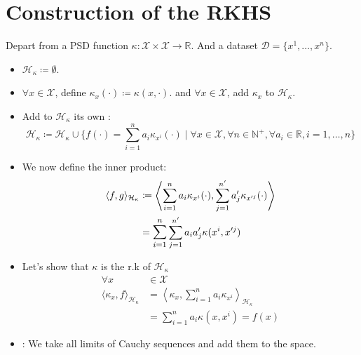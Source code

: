 \pagebreak
\section{Construction of the RKHS}

Depart from a PSD function $\kappa: \mathcal{X} \times \mathcal{X} \to \mathds{R}$.
And a dataset $\mathcal{D} = \{x^1, \dots, x^n\}$.

\begin{itemize}
	\item $\mathcal{H}_\kappa \coloneqq \emptyset$.
	\item $\forall x \in \mathcal{X}$, define $\kappa_x(\cdot) \coloneqq \kappa(x, \cdot)$.
	      and $\forall x \in \mathcal{X}$, add $\kappa_x$ to $\mathcal{H}_\kappa$.
	\item Add to $\mathcal{H}_\kappa$ its own :
	      \begin{equation*}
		      \mathcal{H}_\kappa \coloneqq \mathcal{H}_\kappa \cup \{
		      f(\cdot) = \sum_{i=1}^n a_i \kappa_{x^i}(\cdot) \mid
		      \forall x \in \mathcal{X},
		      \forall n \in \mathds{N}^+,
		      \forall a_i \in \mathds{R},
		      i=1,\dots,n
		      \}
	      \end{equation*}
	\item We now define the inner product:
	      \begin{align*}
		      \langle f, g \rangle_{\mathcal{H}_\kappa} & \coloneqq
		      \left\langle
		      \sum_{i=1}^n a_i \kappa_{x^i}(\cdot), \sum_{j=1}^{n'} a'_j \kappa_{x'^j}(\cdot)
		      \right\rangle                                                                                                          \\
		                                                & = \mathlarger{\sum_{i=1}^n} \sum_{j=1}^{n'} a_i a'_j \kappa({x^i}, {x'^j})
	      \end{align*}
	\item Let's show that $\kappa$ is the r.k of $\mathcal{H}_\kappa$
	      \begin{align*}
		      \forall x                                        & \in \mathcal{X}                          \\
		      \langle \kappa_x, f \rangle_{\mathcal{H}_\kappa} & =
		      \left\langle \kappa_x, \sum_{i=1}^n a_i \kappa_{x^i} \right\rangle_{\mathcal{H}_\kappa}     \\
		                                                       & = \sum_{i=1}^n a_i \kappa(x, x^i) = f(x)
	      \end{align*}
	\item {}: We take all limits of Cauchy sequences
	      and add them to the space.
\end{itemize}

